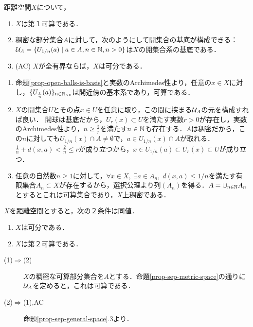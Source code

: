 \documentclass[uplatex,dvipdfmx]{jsreport}
\begin{document}
\begin{proposition}[距離空間では全有界なら可分]\label{prop-sep-metric-space}
    距離空間$X$について，
    \begin{enumerate}
        \item $X$は第１可算である．
        \item 稠密な部分集合$A$に対して，次のようにして開集合の基底が構成できる：$\mathcal{U}_A=\{U_{1/n}(a)\mid a\in A,n\in\mathbb{N},n>0\}$は$X$の開集合系の基底である．
        \item (AC) $X$が全有界ならば，$X$は可分である．
    \end{enumerate}
\end{proposition}
\begin{Proof}\mbox{}
    \begin{enumerate}
        \item 命題\ref{prop-open-balls-is-basis}と実数のArchimedes性より，任意の$x\in X$に対し，$\{U_{\frac{1}{n}}(a)\}_{n\in\mathbb{N}_{>0}}$は開近傍の基本系であり，可算である．
        \item $X$の開集合$U$とその点$x\in U$を任意に取り，この間に挟まる$\mathcal{U}_A$の元を構成すれば良い．
        開球は基底だから，$U_r(x)\subset U$を満たす実数$r>0$が存在し，実数のArchimedes性より，$n\ge\frac{2}{r}$を満たす$n\in\mathbb{N}$も存在する．$A$は稠密だから，この$n$に対しても$U_{1/n}(x)\cap A\ne\emptyset$で，$a\in U_{1/n}(x)\cap A$が取れる．
        $\frac{1}{n}+d(x,a)<\frac{2}{n}\le r$が成り立つから，$x\in U_{1/n}(a)\subset U_r(x)\subset U$が成り立つ．
        \item 
        任意の自然数$n\ge 1$に対して，$\forall x\in X,\;\exists a\in A_n,\;d(x,a)\le 1/n$を満たす有限集合$A_n\subset X$が存在するから，選択公理より列$(A_n)$を得る．$A=\cup_{n\in\mathbb{N}}A_n$とするとこれは可算集合であり，$X$上稠密である．
    \end{enumerate}
\end{Proof}

\begin{corollary}\label{cor-separability-and-second-countability}
    $X$を距離空間とすると，次の２条件は同値．
    \begin{enumerate}
        \item $X$は可分である．
        \item $X$は第２可算である．
    \end{enumerate}
\end{corollary}
\begin{Proof}\mbox{}
    \begin{description}
        \item[(1)$\Rightarrow$(2)] $X$の稠密な可算部分集合を$A$とする．命題\ref{prop-sep-metric-space}の通りに$\mathcal{U}_A$を定めると，これは可算である．
        \item[(2)$\Rightarrow$(1),AC] 命題\ref{prop-sep-general-space}.3より．
    \end{description}
\end{Proof}
\end{document}
